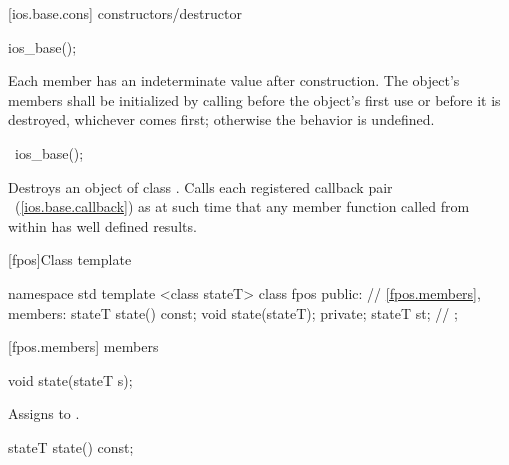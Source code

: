 [ios.base.cons]{ constructors/destructor}

%
\begin{itemdecl}
ios_base();
\end{itemdecl}

\begin{itemdescr}
\pnum
\effects
Each
member has an indeterminate value after construction.
The object's members shall be initialized by calling
before the object's first use or before it is destroyed, whichever comes first; otherwise
the behavior is undefined.
\end{itemdescr}

%
\begin{itemdecl}
~ios_base();
\end{itemdecl}

\begin{itemdescr}
\pnum
\effects
Destroys an object of class
.
Calls each registered callback pair
~(\ref{ios.base.callback}) as
at such time that any
member function called from within
has well defined results.
\end{itemdescr}

[fpos]{Class template }

%
\begin{codeblock}
namespace std {
  template <class stateT> class fpos {
  public:
    // \ref{fpos.members}, members:
    stateT state() const;
    void state(stateT);
  private;
    stateT st; // \expos
  };
}
\end{codeblock}

[fpos.members]{ members}

%
\begin{itemdecl}
void state(stateT s);
\end{itemdecl}

\begin{itemdescr}
\pnum
\effects
Assigns  to .
\end{itemdescr}

%
%
\begin{itemdecl}
stateT state() const;
\end{itemdecl}

